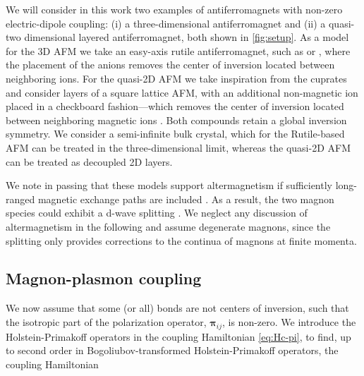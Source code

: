 \documentclass[aps,prb,reprint,twocolumns,superscriptaddress,nofootinbib]{revtex4-2}
\begin{document}
	We will consider in this work two examples of antiferromagnets with non-zero electric-dipole coupling: (i) a  three-dimensional antiferromagnet and (ii) a quasi-two dimensional layered antiferromagnet, both shown in \cref{fig:setup}. As a model for the 3D AFM we take an easy-axis rutile antiferromagnet, such as  or , where the placement of the anions removes the center of inversion located between neighboring ions. For the quasi-2D AFM we take inspiration from the cuprates and consider layers of a square lattice AFM, with an additional non-magnetic ion placed in a checkboard fashion---which removes the center of inversion located between neighboring magnetic ions \cite{shanDynamicMagneticPhase2024}. Both compounds retain a global inversion symmetry. 	
	We consider a semi-infinite bulk crystal, which for the Rutile-based AFM can be treated in the three-dimensional limit, whereas the quasi-2D AFM can be treated as decoupled 2D layers. 
	
	We note in passing that these models support altermagnetism \cite{smejkalEmergingResearchLandscape2022,smejkalConventionalFerromagnetismAntiferromagnetism2022} if sufficiently long-ranged magnetic exchange paths are included \cite{liuChiralSplitMagnon2024,smejkalChiralMagnonsAltermagnetic2023, gohlkeSpuriousSymmetryEnhancement2023}. As a result, the two magnon species could exhibit a d-wave splitting \cite{smejkalChiralMagnonsAltermagnetic2023}. We neglect any discussion of altermagnetism in the following and assume degenerate magnons, since the splitting only provides corrections to the continua of magnons at finite momenta.
	
	
	
	
	
	
	
	
	
	
	
	
	
	
	
	
	
	\subsection{Magnon-plasmon coupling}
	We now assume that some (or all) bonds are not centers of inversion, such that the isotropic part of the polarization operator, $\bm\pi_{ij}$, is non-zero.
	We introduce the Holstein-Primakoff operators in the coupling Hamiltonian \cref{eq:Hc-pi}, to find, up to second order in Bogoliubov-transformed Holstein-Primakoff operators, the coupling Hamiltonian
	
\end{document}
